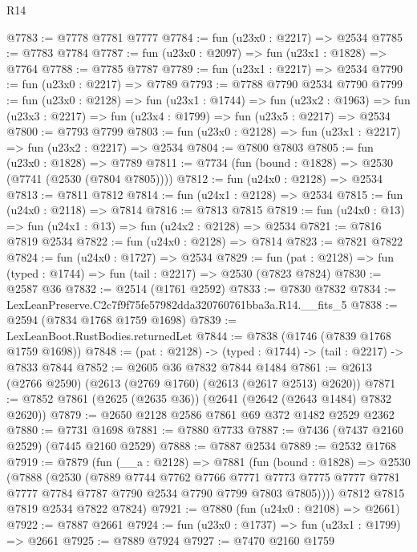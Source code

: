 \begin{lexlean}{R14}
\begin{coremodule}
@7783 := @7778 @7781 @7777
@7784 := fun (u23x0 : @2217) => @2534
@7785 := @7783 @7784
@7787 := fun (u23x0 : @2097) => fun (u23x1 : @1828) => @7764
@7788 := @7785 @7787
@7789 := fun (u23x1 : @2217) => @2534
@7790 := fun (u23x0 : @2217) => @7789
@7793 := @7788 @7790 @2534 @7790
@7799 := fun (u23x0 : @2128) =>
  fun (u23x1 : @1744) =>
  fun (u23x2 : @1963) => fun (u23x3 : @2217) => fun (u23x4 : @1799) => fun (u23x5 : @2217) => @2534
@7800 := @7793 @7799
@7803 := fun (u23x0 : @2128) => fun (u23x1 : @2217) => fun (u23x2 : @2217) => @2534
@7804 := @7800 @7803
@7805 := fun (u23x0 : @1828) => @7789
@7811 := @7734 (fun (bound : @1828) => @2530 (@7741 (@2530 (@7804 @7805))))
@7812 := fun (u24x0 : @2128) => @2534
@7813 := @7811 @7812
@7814 := fun (u24x1 : @2128) => @2534
@7815 := fun (u24x0 : @2118) => @7814
@7816 := @7813 @7815
@7819 := fun (u24x0 : @13) => fun (u24x1 : @13) => fun (u24x2 : @2128) => @2534
@7821 := @7816 @7819 @2534
@7822 := fun (u24x0 : @2128) => @7814
@7823 := @7821 @7822
@7824 := fun (u24x0 : @1727) => @2534
@7829 := fun (pat : @2128) => fun (typed : @1744) => fun (tail : @2217) => @2530 (@7823 @7824)
@7830 := @2587 @36
@7832 := @2514 (@1761 @2592)
@7833 := @7830 @7832
@7834 := LexLeanPreserve.C2c7f9f75fe57982dda320760761bba3a.R14.__fits_5
@7838 := @2594 (@7834 @1768 @1759 @1698)
@7839 := LexLeanBoot.RustBodies.returnedLet
@7844 := @7838 (@1746 (@7839 @1768 @1759 @1698))
@7848 := (pat : @2128) -> (typed : @1744) -> (tail : @2217) -> @7833 @7844
@7852 := @2605 @36 @7832 @7844 @1484
@7861 := @2613 (@2766 @2590) (@2613 (@2769 @1760) (@2613 (@2617 @2513) @2620))
@7871 := @7852 @7861 (@2625 (@2635 @36)) (@2641 (@2642 (@2643 @1484) @7832 @2620))
@7879 := @2650 @2128 @2586 @7861 @69 @372 @1482 @2529 @2362
@7880 := @7731 @1698
@7881 := @7880 @7733
@7887 := @7436 (@7437 @2160 @2529) (@7445 @2160 @2529)
@7888 := @7887 @2534
@7889 := @2532 @1768
@7919 := @7879
    (fun (__a : @2128) =>
    @7881
      (fun (bound : @1828) =>
      @2530
        (@7888
          (@2530
            (@7889
              @7744
              @7762
              @7766
              @7771
              @7773
              @7775
              @7777
              @7781
              @7777
              @7784
              @7787
              @7790
              @2534
              @7790
              @7799
              @7803
              @7805))))
      @7812
      @7815
      @7819
      @2534
      @7822
      @7824)
@7921 := @7880 (fun (u24x0 : @2108) => @2661)
@7922 := @7887 @2661
@7924 := fun (u23x0 : @1737) => fun (u23x1 : @1799) => @2661
@7925 := @7889 @7924
@7927 := @7470 @2160 @1759

\end{coremodule}
\end{lexlean}
